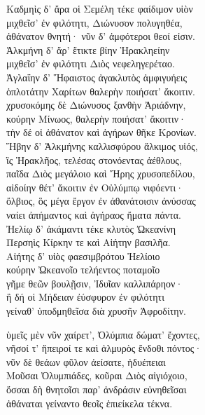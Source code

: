 \begin{pages}
\begin{Leftside}
\quad{}Καδμηὶς δ' ἄρα οἱ Σεμέλη τέκε φαίδιμον υἱὸν  \\
μιχθεῖσ' ἐν φιλότητι, Διώνυσον πολυγηθέα, \\
ἀθάνατον θνητή· νῦν δ' ἀμφότεροι θεοί εἰσιν. \\

\quad{}Ἀλκμήνη δ' ἄρ' ἔτικτε βίην Ἡρακληείην\\
μιχθεῖσ' ἐν φιλότητι Διὸς νεφεληγερέταο. \\

\quad{}Ἀγλαΐην δ' Ἥφαιστος ἀγακλυτὸς ἀμφιγυήεις  \\
ὁπλοτάτην Χαρίτων θαλερὴν ποιήσατ' ἄκοιτιν.\\

\quad{}χρυσοκόμης δὲ Διώνυσος ξανθὴν Ἀριάδνην,\\
κούρην Μίνωος, θαλερὴν ποιήσατ' ἄκοιτιν· \\
τὴν δέ οἱ ἀθάνατον καὶ ἀγήρων θῆκε Κρονίων.\\

\quad{}Ἥβην δ' Ἀλκμήνης καλλισφύρου ἄλκιμος υἱός,  \\
ἲς Ἡρακλῆος, τελέσας στονόεντας ἀέθλους,\\
παῖδα Διὸς μεγάλοιο καὶ Ἥρης χρυσοπεδίλου,\\
αἰδοίην θέτ' ἄκοιτιν ἐν Οὐλύμπῳ νιφόεντι· \\
ὄλβιος, ὃς μέγα ἔργον ἐν ἀθανάτοισιν ἀνύσσας\\
ναίει ἀπήμαντος καὶ ἀγήραος ἤματα πάντα. \\

\quad{}Ἠελίῳ δ' ἀκάμαντι τέκε κλυτὸς Ὠκεανίνη \\
Περσηὶς Κίρκην τε καὶ Αἰήτην βασιλῆα.\\
Αἰήτης δ' υἱὸς φαεσιμβρότου Ἠελίοιο\\
κούρην Ὠκεανοῖο τελήεντος ποταμοῖο\\
γῆμε θεῶν βουλῇσιν, Ἰδυῖαν καλλιπάρηον· \\
ἣ δή οἱ Μήδειαν ἐύσφυρον ἐν φιλότητι\\
γείναθ' ὑποδμηθεῖσα διὰ χρυσῆν Ἀφροδίτην. \\

\smallskip
\begin{center}\end{center}
\smallskip

ὑμεῖς μὲν νῦν χαίρετ', Ὀλύμπια δώματ' ἔχοντες, \\
νῆσοί τ' ἤπειροί τε καὶ ἁλμυρὸς ἔνδοθι πόντος· \\
νῦν δὲ θεάων φῦλον ἀείσατε, ἡδυέπειαι \\
Μοῦσαι Ὀλυμπιάδες, κοῦραι Διὸς αἰγιόχοιο,\\
ὅσσαι δὴ θνητοῖσι παρ' ἀνδράσιν εὐνηθεῖσαι\\
ἀθάναται γείναντο θεοῖς ἐπιείκελα τέκνα.\\


\end{Leftside}
\end{pages}
